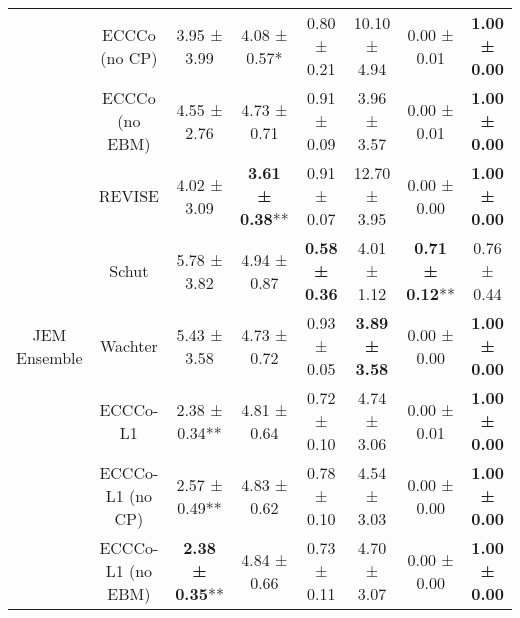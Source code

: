 \begin{table}
{\begin{tabular}[t]{cccccccc}
 & ECCCo (no CP) & 3.95 ± 3.99\hphantom{*}\hphantom{*} & 4.08 ± 0.57*\hphantom{*} & 0.80 ± 0.21\hphantom{*}\hphantom{*} & 10.10 ± 4.94\hphantom{*}\hphantom{*} & 0.00 ± 0.01\hphantom{*}\hphantom{*} & \textbf{1.00 ± 0.00}\hphantom{*}\hphantom{*}\\

 & ECCCo (no EBM) & 4.55 ± 2.76\hphantom{*}\hphantom{*} & 4.73 ± 0.71\hphantom{*}\hphantom{*} & 0.91 ± 0.09\hphantom{*}\hphantom{*} & 3.96 ± 3.57\hphantom{*}\hphantom{*} & 0.00 ± 0.01\hphantom{*}\hphantom{*} & \textbf{1.00 ± 0.00}\hphantom{*}\hphantom{*}\\

 & REVISE & 4.02 ± 3.09\hphantom{*}\hphantom{*} & \textbf{3.61 ± 0.38}** & 0.91 ± 0.07\hphantom{*}\hphantom{*} & 12.70 ± 3.95\hphantom{*}\hphantom{*} & 0.00 ± 0.00\hphantom{*}\hphantom{*} & \textbf{1.00 ± 0.00}\hphantom{*}\hphantom{*}\\

 & Schut & 5.78 ± 3.82\hphantom{*}\hphantom{*} & 4.94 ± 0.87\hphantom{*}\hphantom{*} & \textbf{0.58 ± 0.36}\hphantom{*}\hphantom{*} & 4.01 ± 1.12\hphantom{*}\hphantom{*} & \textbf{0.71 ± 0.12}** & 0.76 ± 0.44\hphantom{*}\hphantom{*}\\

\multirow[t]{-10}{*}{\centering\arraybackslash JEM Ensemble} & Wachter & 5.43 ± 3.58\hphantom{*}\hphantom{*} & 4.73 ± 0.72\hphantom{*}\hphantom{*} & 0.93 ± 0.05\hphantom{*}\hphantom{*} & \textbf{3.89 ± 3.58}\hphantom{*}\hphantom{*} & 0.00 ± 0.00\hphantom{*}\hphantom{*} & \textbf{1.00 ± 0.00}\hphantom{*}\hphantom{*}\\
\cmidrule{1-8}
 & ECCCo-L1 & 2.38 ± 0.34** & 4.81 ± 0.64\hphantom{*}\hphantom{*} & 0.72 ± 0.10\hphantom{*}\hphantom{*} & 4.74 ± 3.06\hphantom{*}\hphantom{*} & 0.00 ± 0.01\hphantom{*}\hphantom{*} & \textbf{1.00 ± 0.00}\hphantom{*}\hphantom{*}\\

 & ECCCo-L1 (no CP) & 2.57 ± 0.49** & 4.83 ± 0.62\hphantom{*}\hphantom{*} & 0.78 ± 0.10\hphantom{*}\hphantom{*} & 4.54 ± 3.03\hphantom{*}\hphantom{*} & 0.00 ± 0.00\hphantom{*}\hphantom{*} & \textbf{1.00 ± 0.00}\hphantom{*}\hphantom{*}\\

 & ECCCo-L1 (no EBM) & \textbf{2.38 ± 0.35}** & 4.84 ± 0.66\hphantom{*}\hphantom{*} & 0.73 ± 0.11\hphantom{*}\hphantom{*} & 4.70 ± 3.07\hphantom{*}\hphantom{*} & 0.00 ± 0.00\hphantom{*}\hphantom{*} & \textbf{1.00 ± 0.00}\hphantom{*}\hphantom{*}\\


\end{tabular}}
\end{table}
